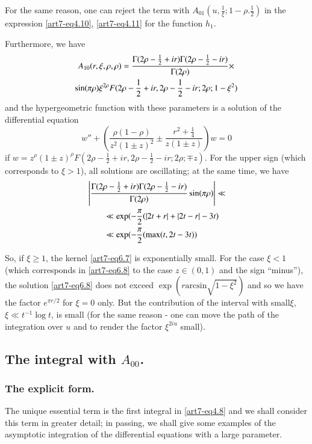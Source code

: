 For the same reason, one can reject the term with $A_{01} (u, \frac{1}{\xi}; 1 - \rho. \frac{1}{2})$ in the expression \eqref{art7-eq4.10}, \eqref{art7-eq4.11} for the function $h_1$.

Furthermore, we have 
\begin{gather}
A_{10} (r, \xi, \rho, \rho) = \frac{\Gamma (2 \rho - \frac{1}{2} + ir) \Gamma (2 \rho - \frac{1}{2} - ir)}{\Gamma (2 \rho)} \times \label{art7-eq6.7}\\
\sin (\pi \rho) \xi^{2\rho} F (2 \rho - \frac{1}{2} + ir, 2 \rho - \frac{1}{2} - ir; 2 \rho ; 1 - \xi^2)  \notag
\end{gather}
and the hypergeometric function with these parameters is a solution of the differential equation
\begin{equation}
w''  + \left( \frac{\rho(1-\rho)}{z^2 (1\pm z)^2} \pm \frac{r^2 + \frac{1}{4}}{z(1\pm z)}\right) w =0\label{art7-eq6.8}
\end{equation}
if $w = z^\rho (1\pm z)^\rho F (2 \rho - \frac{1}{2} + ir, 2 \rho - \frac{1}{2}  -ir; 2 \rho; \mp z)$. For the upper sign (which corresponds to $\xi > 1$), all solutions are oscillating; at the same time, we have 
\begin{align}
& \left|\frac{\Gamma (2 \rho - \frac{1}{2} + ir) \Gamma (2 \rho - \frac{1}{2}  - ir)}{\Gamma (2 \rho)}  \sin (\pi \rho)\right| \ll \label{art7-eq6.9}\\
& \qquad \ll \exp (-\frac{\pi}{2} (|2t+ r |+| 2t - r| - 3 t) \notag\\
& \qquad \ll \exp (-\frac{\pi}{2} (\max (t, 2t - 3t)) \notag
\end{align}

So,  if $\xi \geqslant 1$, the kernel \eqref{art7-eq6.7} is exponentially small. For the case $\xi < 1$ (which corresponds in \eqref{art7-eq6.8} to the case $z \in (0,1)$ and the sign ``minus''), the solution \eqref{art7-eq6.8} does not exceed $\exp (r \text{arcsin} \sqrt{1-\xi^2})$ and so we have the factor $e^{\pi r/2}$ for $\xi =0$ only. But the contribution of the interval with small\pageoriginale $\xi$, $\xi \ll t^{-1} \log t$, is small (for the same reason - one can move the path of the integration over $u$ and to render the factor $\xi^{2i u}$ small).

\setcounter{section}{2}
\subsection{The integral with $A_{00}$.}\label{art7-subsec2.6}
\subsubsection{The explicit form.}\label{art7-subsubsec2.6.1}
The unique essential term is the first integral in \eqref{art7-eq4.8} and we shall consider this term in greater detail; in passing, we shall give some examples of the asymptotic integration of the differential equations with a large parameter.

